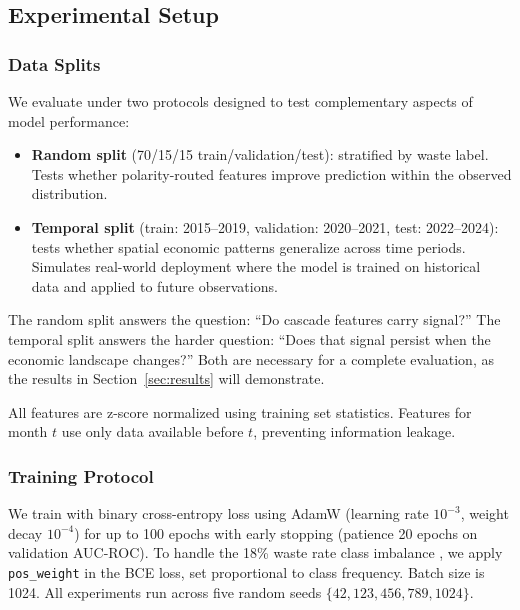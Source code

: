 \documentclass[preprint,12pt,authoryear]{elsarticle}
\begin{document}
\subsection{Experimental Setup}
\label{sec:experimental}

\subsubsection{Data Splits}

We evaluate under two protocols designed to test complementary aspects of model performance:

\begin{itemize}[leftmargin=*]
    \item \textbf{Random split} (70/15/15 train/validation/test): stratified by waste label. Tests whether polarity-routed features improve prediction within the observed distribution.
    \item \textbf{Temporal split} (train: 2015--2019, validation: 2020--2021, test: 2022--2024): tests whether spatial economic patterns generalize across time periods. Simulates real-world deployment where the model is trained on historical data and applied to future observations.
\end{itemize}

The random split answers the question: ``Do cascade features carry signal?'' The temporal split answers the harder question: ``Does that signal persist when the economic landscape changes?'' Both are necessary for a complete evaluation, as the results in Section~\ref{sec:results} will demonstrate.

All features are z-score normalized using training set statistics. Features for month $t$ use only data available before $t$, preventing information leakage.

\subsubsection{Training Protocol}

We train with binary cross-entropy loss using AdamW \citep{loshchilov2019adamw} (learning rate $10^{-3}$, weight decay $10^{-4}$) for up to 100 epochs with early stopping (patience 20 epochs on validation AUC-ROC). To handle the 18\% waste rate class imbalance \citep{johnson2019survey}, we apply \texttt{pos\_weight} in the BCE loss, set proportional to class frequency. Batch size is 1024. All experiments run across five random seeds $\{42, 123, 456, 789, 1024\}$.
\end{document}
